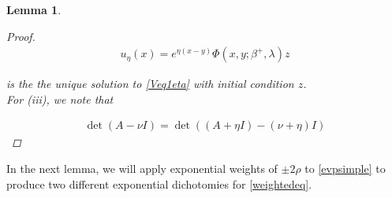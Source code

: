 \documentclass[12pt]{article}
\newtheorem{lemma}{Lemma}
\begin{document}
\begin{lemma}
\begin{proof}
\begin{align*}
u_\eta(x) = e^{\eta(x-y)} \Phi(x, y; \beta^+, \lambda) z
\end{align*}

is the the unique solution to \eqref{Veq1eta} with initial condition $z$.\\

For (iii), we note that

\begin{align*}
\det(A - \nu I) = \det( (A + \eta I) - (\nu + \eta) I )
\end{align*}

\end{proof}
\end{lemma}

In the next lemma, we will apply exponential weights of $\pm 2 \rho$ to \eqref{evpsimple} to produce two different exponential dichotomies for \eqref{weightedeq}.

\end{document}
